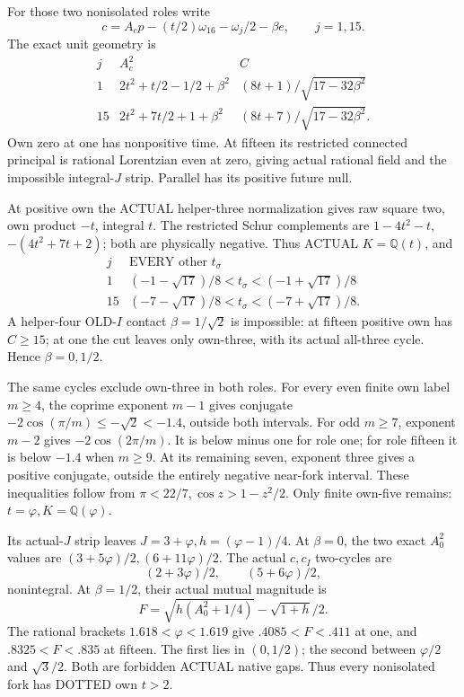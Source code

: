\documentclass[11pt]{article}
\begin{document}
For those two nonisolated roles write
\[
       c=A_cp-(t/2)\omega_{16}-\omega_j/2-\beta e,\qquad j=1,15 .
\]
The exact unit geometry is
\[
\begin{array}{c|c|c}
 j&A_c^2&C\\ \hline
 1&2t^2+t/2-1/2+\beta^2&(8t+1)/\sqrt{17-32\beta^2}\\
 15&2t^2+7t/2+1+\beta^2&(8t+7)/\sqrt{17-32\beta^2}.
\end{array}
\]
Own zero at one has nonpositive time.
At fifteen its restricted connected
principal is rational Lorentzian even
at zero, giving actual rational field
and the impossible integral-\(J\) strip.
Parallel has its positive future null.

At positive own the ACTUAL helper-three
normalization gives raw square two,
own product \(-t\), integral \(t\).
The restricted Schur complements are
\(1-4t^2-t\), \(-(4t^2+7t+2)\);
both are physically negative.
Thus ACTUAL \(K=\mathbb Q(t)\), and
\[
\begin{array}{c|c}
 j&\text{EVERY other }t_\sigma\\ \hline
 1&(-1-\sqrt{17})/8<t_\sigma<(-1+\sqrt{17})/8\\
 15&(-7-\sqrt{17})/8<t_\sigma<(-7+\sqrt{17})/8 .
\end{array}
\tag{D16Itstrip}\label{eq:arithD16Inonisolatedstrip}
\]
A helper-four OLD-\(I\) contact
\(\beta=1/\sqrt2\) is impossible:
at fifteen positive own has \(C\ge15\);
at one the cut leaves only own-three,
with its actual all-three cycle.
Hence \(\beta=0,1/2\).

The same cycles exclude own-three
in both roles.
For every even finite own label
\(m\ge4\), the coprime exponent
\(m-1\) gives conjugate
\(-2\cos(\pi/m)\le-\sqrt2<-1.4\),
outside both intervals.
For odd \(m\ge7\), exponent \(m-2\)
gives \(-2\cos(2\pi/m)\).
It is below minus one for role one;
for role fifteen it is below \(-1.4\)
when \(m\ge9\).
At its remaining seven, exponent three
gives a positive conjugate, outside
the entirely negative near-fork interval.
These inequalities follow from
\(\pi<22/7,\cos z>1-z^2/2\).
Only finite own-five remains:
\(t=\varphi,K=\mathbb Q(\varphi)\).

Its actual-\(J\) strip leaves
\(J=3+\varphi,h=(\varphi-1)/4\).
At \(\beta=0\), the two exact
\(A_0^2\) values are
\((3+5\varphi)/2,(6+11\varphi)/2\).
The actual \(c,c_I\) two-cycles are
\[
                          (2+3\varphi)/2,\qquad(5+6\varphi)/2 ,
\]
nonintegral.
At \(\beta=1/2\), their actual mutual
magnitude is
\[
                     F=\sqrt{h(A_0^2+1/4)}
                                     -\sqrt{1+h}/2 .
\]
The rational brackets
\(1.618<\varphi<1.619\) give
\(.4085<F<.411\) at one, and
\(.8325<F<.835\) at fifteen.
The first lies in \((0,1/2)\);
the second between \(\varphi/2\)
and \(\sqrt3/2\).
Both are forbidden ACTUAL native gaps.
Thus every nonisolated fork has
DOTTED own \(t>2\).
\end{document}
